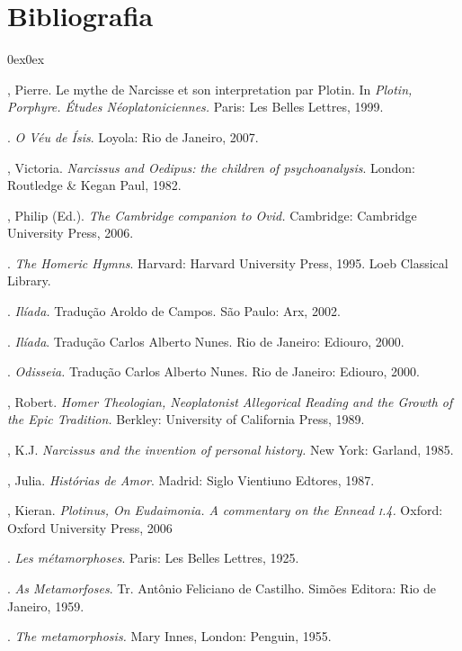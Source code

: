 \section{Bibliografia}

\begin{description}0ex\parsep0ex
\newcommand{\tit}[1]{\item[\textnormal{\textsc{\MakeTextLowercase{#1}}}]}
\newcommand{\titidem}{\item[\line(1,0){25}]}
\tit{HADOT}, Pierre. Le mythe de Narcisse et son interpretation par Plotin.
In \emph{Plotin, Porphyre. Études Néoplatoniciennes.} Paris: Les
Belles Lettres, 1999.

\titidem. \emph{O Véu de Ísis}. Loyola: Rio de Janeiro,
2007.

\tit{HAMILTON}, Victoria. \emph{Narcissus and Oedipus: the children of
psychoanalysis}. London: Routledge \& Kegan Paul, 1982.

\tit{HARDIE}, Philip (Ed.). \emph{The Cambridge companion to Ovid.}
Cambridge: Cambridge University Press, 2006. 

\tit{HOMER}. \emph{The Homeric Hymns}. Harvard: Harvard University Press,
1995. Loeb Classical Library.

\titidem. \emph{Ilíada.} Tradução Aroldo de Campos. São
Paulo: Arx, 2002.

\titidem. \emph{Ilíada}. Tradução Carlos Alberto Nunes.
Rio de Janeiro: Ediouro, 2000.

\titidem. \emph{Odisseia}\emph{.} Tradução Carlos
Alberto Nunes. Rio de Janeiro: Ediouro, 2000.

\tit{LAMBERTON}, Robert. \emph{Homer Theologian, Neoplatonist Allegorical
Reading and the Growth of the Epic Tradition.} Berkley: University of
California Press, 1989.

\tit{KNOESPEL}, K.J. \emph{Narcissus and the invention of personal
history.} New York: Garland, 1985.

\tit{KRISTEVA}, Julia. \emph{Histórias de Amor}. Madrid: Siglo Vientiuno
Edtores, 1987.

\tit{MACGROARTY}, Kieran. \emph{Plotinus, On Eudaimonia. A commentary on
the Ennead \textsc{i}.4.} Oxford: Oxford University Press, 2006

\tit{OVID}. \emph{Les métamorphoses}. Paris: Les Belles Lettres,
1925.

\titidem. \emph{As Metamorfoses}. Tr. Antônio Feliciano
de Castilho. Simões Editora: Rio de Janeiro, 1959. 

\titidem. \emph{The metamorphosis.} Mary
Innes,
London: Penguin, 1955.


\end{description}
